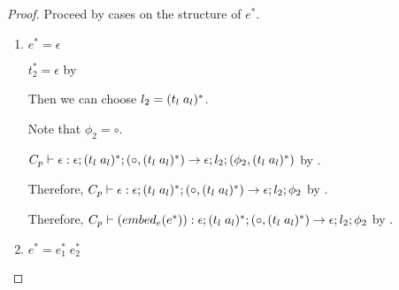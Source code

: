 \begin{proof}




    Proceed by cases on the structure of $e^{*}$.

    \begin{enumerate}
        \item $e^{*} = \epsilon$

        $t_2^{*} = \epsilon$ by 

        Then we can choose $l_2 = \ti{t_l}{a_l}^{*}$.

        Note that $\phi_2 = \circ$.

        $C_p \vdash \epsilon : \epsilon;\ti{t_l}{a_l}^{*};(\circ,\ti{t_l}{a_l}^{*}) \rightarrow \epsilon;l_2;(\phi_2,\ti{t_l}{a_l}^{*})$ by .

        Therefore, $C_p \vdash \epsilon : \epsilon;\ti{t_l}{a_l}^{*};(\circ,\ti{t_l}{a_l}^{*}) \rightarrow \epsilon;l_2;\phi_2$ by .

        Therefore, $C_p \vdash (\embed[e]{e^{*}}) : \epsilon;\ti{t_l}{a_l}^{*};(\circ,\ti{t_l}{a_l}^{*}) \rightarrow \epsilon;l_2;\phi_2$ by .

        \item $e^{*} = e_1^{*}\; e_2^{*}$



\end{enumerate}
\end{proof}
